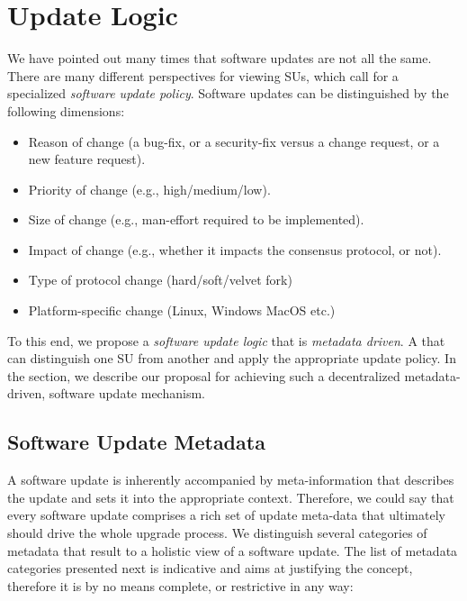 \section{Update Logic}
We have pointed out many times that software updates are not all the same. There are many different perspectives for viewing SUs, which call for a specialized \emph{software update policy}. Software updates can be distinguished by the following dimensions:
\begin{itemize}
\item Reason of change (a bug-fix, or a security-fix versus a change request, or a new feature request).
\item Priority of change (e.g., high/medium/low).
\item Size of change (e.g., man-effort required to be implemented).
\item Impact of change (e.g., whether it impacts the consensus protocol, or not).
\item Type of protocol change (hard/soft/velvet fork)
\item Platform-specific change (Linux, Windows MacOS etc.)
\end{itemize}
To this end, we propose a \emph{software update logic} that is \emph{metadata driven}. A  that can distinguish one SU from another and apply the appropriate update policy. In the section, we describe our proposal for achieving such a decentralized metadata-driven, software update mechanism.

\subsection{Software Update Metadata} 
A software update is inherently accompanied by meta-information that describes the update and sets it into the appropriate context. Therefore, we could say that every software update comprises a rich set of update meta-data that ultimately should drive the whole upgrade process. We distinguish several categories of metadata that result to a holistic view of a software update. The list of metadata categories presented next is indicative and aims at justifying the concept, therefore it is by no means complete, or restrictive in any way:
